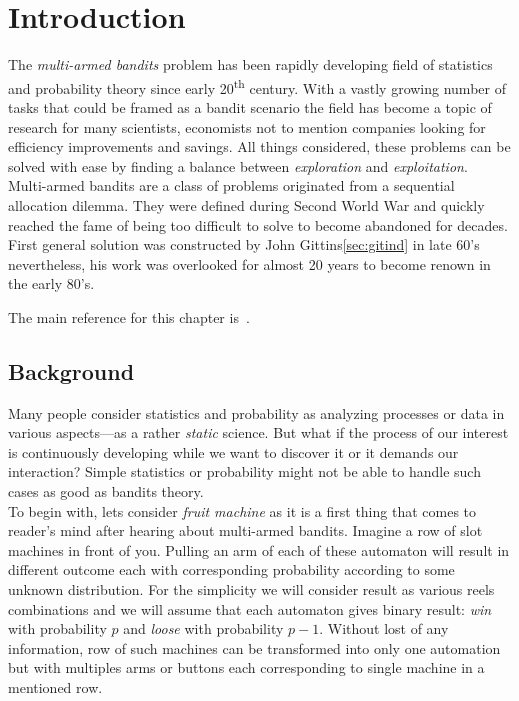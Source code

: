 \documentclass[12pt, a4paper, pdflatex, leqno]{report}
\newcommand{\ts}{\textsuperscript}
\begin{document}
\newpage
\thispagestyle{empty}
\cleardoublepage
\pagestyle{plain}
\setcounter{page}{1}

\tableofcontents



\chapter{Introduction\label{chap:intro}}
The \emph{multi-armed bandits} problem has been rapidly developing field of statistics and probability theory since early 20\ts{th} century. With a vastly growing number of tasks that could be framed as a bandit scenario the field has become a topic of research for many scientists, economists not to mention companies looking for efficiency improvements and savings. All things considered, these problems can be solved with ease by finding a balance between \emph{exploration} and \emph{exploitation}.\\

Multi-armed bandits are a class of problems originated from a sequential allocation dilemma. They were defined during Second World War and quickly reached the fame of being too difficult to solve to become abandoned for decades. First general solution was constructed by John Gittins\ref{sec:gitind} in late 60's nevertheless, his work was overlooked for almost 20 years to become renown in the early 80's.~\citep{gittins+glazebrook+weber}

\noindent The main reference for this chapter is~\citep{berry+firstedt}.\\


\section{Background}
Many people consider statistics and probability as analyzing processes or data in various aspects---as a rather \emph{static} science. But what if the process of our interest is continuously developing while we want to discover it or it demands our interaction? Simple statistics or probability might not be able to handle such cases as good as bandits theory.\\

To begin with, lets consider \emph{fruit machine} as it is a first thing that comes to reader's mind after hearing about multi-armed bandits. Imagine a row of slot machines in front of you. Pulling an arm of each of these automaton will result in different outcome each with corresponding probability according to some unknown distribution. For the simplicity we will consider result as various reels combinations and we will assume that each automaton gives binary result: \emph{win} with probability $p$ and \emph{loose} with probability $p-1$. Without lost of any information, row of such machines can be transformed into only one automation but with multiples arms or buttons each corresponding to single machine in a mentioned row.\\
\end{document}
